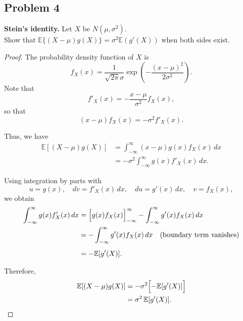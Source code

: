 \documentclass[letterpaper, 11pt]{article}
\newcommand{\1}{\mathds{1}}	%
\theoremstyle{definition}
\begin{document}
    \subsection*{Problem 4}
 \textbf{Stein's identity.} Let $X$ be $N(\mu, \sigma^2)$. \\
 Show that $\mathbb{E}\{(X - \mu)g(X)\} = \sigma^2\mathbb{E}(g'(X))$ when both sides exist.
 \begin{proof}
    The probability density function of \(X\) is
\[
f_X(x) = \frac{1}{\sqrt{2\pi}\sigma}\exp\left(-\frac{(x-\mu)^2}{2\sigma^2}\right).
\]
Note that
\[
f'_X(x) = -\frac{x-\mu}{\sigma^2}f_X(x),
\]
so that
\[
(x-\mu)f_X(x) = -\sigma^2 f'_X(x).
\]

Thus, we have
\begin{align*}
\mathbb{E}[(X-\mu)g(X)]
&= \int_{-\infty}^{\infty}(x-\mu)g(x)f_X(x)\,dx \\
&= -\sigma^2 \int_{-\infty}^{\infty}g(x)f'_X(x)\,dx.
\end{align*}

Using integration by parts with
\[
u = g(x), \quad dv = f'_X(x)\,dx, \quad du = g'(x)\,dx, \quad v = f_X(x),
\]
we obtain
\begin{align*}
\int_{-\infty}^{\infty}g(x)f'_X(x)\,dx 
&= \Bigl[g(x)f_X(x)\Bigr]_{-\infty}^{\infty} - \int_{-\infty}^{\infty}g'(x)f_X(x)\,dx \\
&= -\int_{-\infty}^{\infty}g'(x)f_X(x)\,dx \quad \text{(boundary term vanishes)}\\[1ex]
&= -\mathbb{E}[g'(X)].
\end{align*}

Therefore,
\begin{align*}
\mathbb{E}[(X-\mu)g(X)]
&= -\sigma^2\Bigl[-\mathbb{E}[g'(X)]\Bigr] \\
&= \sigma^2\,\mathbb{E}[g'(X)].
\end{align*}

 \end{proof}
\end{document}
